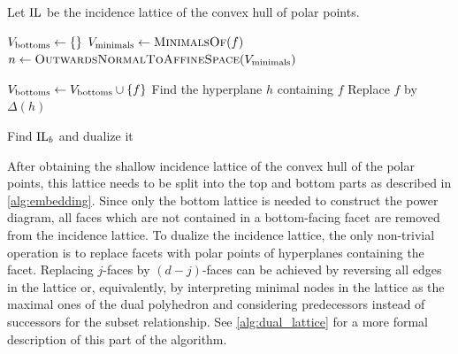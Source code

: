 \begin{algorithm}[tbp]
    Let $\operatorname{IL}$ be the incidence lattice of the convex hull of polar points.
    \begin{algorithmic}[1]
            \State $V_{\textnormal{bottoms}} \gets \left\{  \right\}$
            \State $V_{\textnormal{minimals}} \gets \Call{MinimalsOf}{f}$
                \State $n \gets \Call{OutwardsNormalToAffineSpace}{V_{\textnormal{minimals}}}$

                    \State $V_{\textnormal{bottoms}} \gets V_{\textnormal{bottoms}} \cup \left\{ f \right\}$
                \EndIf
            \EndFor
                    \State {}
                \EndIf
            \EndFor
        \EndProcedure
        \Statex
                \State Find the hyperplane $h$ containing $f$
                \State Replace $f$ by $\Delta(h)$
            \EndFor
            \Statex{}
        \EndProcedure
    \end{algorithmic}
    \caption{Find $\operatorname{IL}_b$ and dualize it}
    \label{alg:dual_lattice}
\end{algorithm}
After obtaining the shallow incidence lattice of the convex hull of the polar points, this lattice needs to be split into the top and bottom parts as described in \cref{alg:embedding}.
Since only the bottom lattice is needed to construct the power diagram, all faces which are not contained in a bottom-facing facet are removed from the incidence lattice.
To dualize the incidence lattice, the only non-trivial operation is to replace facets with polar points of hyperplanes containing the facet.
Replacing $j$-faces by $(d-j)$-faces can be achieved by reversing all edges in the lattice or, equivalently, by interpreting minimal nodes in the lattice as the maximal ones of the dual polyhedron and considering predecessors instead of successors for the subset relationship.
See \cref{alg:dual_lattice} for a more formal description of this part of the algorithm.

